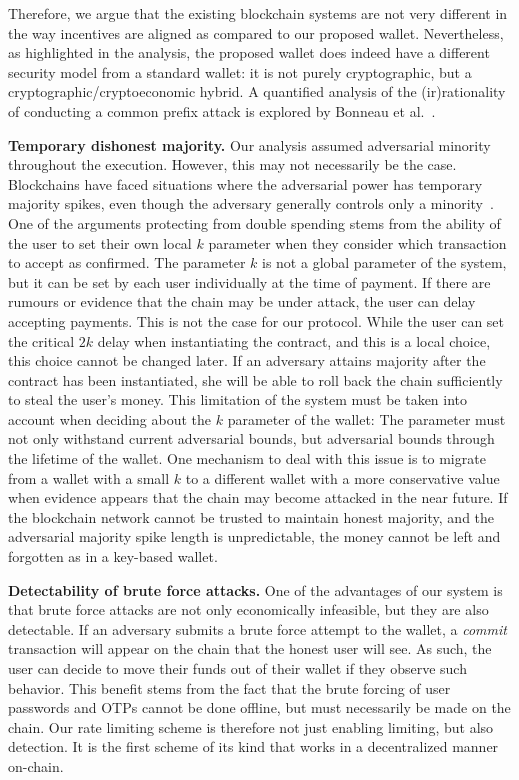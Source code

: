 Therefore, we argue that the existing blockchain systems are not very
different in the way incentives are aligned as compared to our proposed
wallet. Nevertheless, as highlighted in the analysis, the proposed wallet
does indeed have a different security model from a standard wallet: it
is not purely cryptographic, but a cryptographic/cryptoeconomic hybrid.
A quantified analysis of the (ir)rationality of conducting a common prefix
attack is explored by Bonneau et al.~\cite{bonneau2015bitcoin}.

\noindent
\textbf{Temporary dishonest majority.}
Our analysis assumed adversarial minority
throughout the execution. However, this may not necessarily be the case.
Blockchains have faced situations where
the adversarial power has temporary majority spikes,
even though the adversary generally controls only a
minority~\cite{temporary-dishonest,supremacy}.
One of the arguments protecting from double spending stems from
the ability of the user to set their own local $k$ parameter when they
consider which transaction to accept as confirmed. The parameter $k$ is
not a global parameter of the system, but it can be set by each user
individually at the time of payment. If there are rumours or evidence
that the chain may be under attack, the user can delay accepting payments.
This is not the case for our protocol. While the user can set the critical
$2k$ delay when instantiating the contract, and this is a local choice,
this choice cannot be changed later. If an adversary attains majority
after the contract has been instantiated, she will be able to roll
back the chain sufficiently to steal the user's money. This limitation
of the system must be taken into account when deciding about the $k$
parameter of the wallet: The parameter must not only withstand current
adversarial bounds, but adversarial bounds through the lifetime of the
wallet. One mechanism to deal with this issue is to migrate from a
wallet with a small $k$ to a different wallet with a more
conservative value when evidence appears that the chain may become
attacked in the near future. If the blockchain network cannot be
trusted to maintain honest majority, and the adversarial majority spike
length is unpredictable, the money cannot be left and forgotten
as in a key-based wallet.

\noindent
\textbf{Detectability of brute force attacks.}
One of the advantages of our system is that brute force attacks are
not only economically infeasible, but they are also detectable. If an
adversary submits a brute force attempt to the wallet, a \emph{commit}
transaction will appear on the chain that the honest user will see.
As such, the user can decide to move their funds out of their wallet
if they observe such behavior. This benefit stems from the fact that
the brute forcing of user passwords and OTPs cannot be done offline,
but must necessarily be made on the chain. Our rate limiting scheme
is therefore not just enabling limiting, but also detection. It is
the first scheme of its kind that works in a decentralized manner
on-chain.
